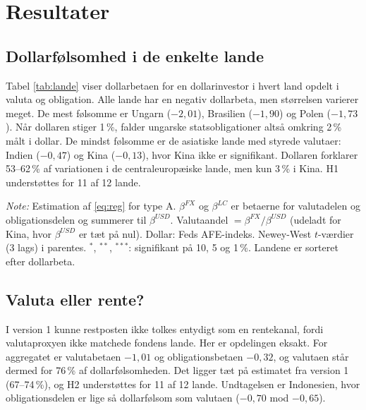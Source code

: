 \documentclass[11pt,a4paper]{article}
\begin{document}
\section{Resultater}

\subsection{Dollarfølsomhed i de enkelte lande}
Tabel \ref{tab:lande} viser dollarbetaen for en dollarinvestor i hvert land opdelt i valuta og obligation. Alle lande har en negativ dollarbeta, men størrelsen varierer meget. De mest følsomme er Ungarn ($-2{,}01$), Brasilien ($-1{,}90$) og Polen ($-1{,}73$). Når dollaren stiger 1\,\%, falder ungarske statsobligationer altså omkring 2\,\% målt i dollar. De mindst følsomme er de asiatiske lande med styrede valutaer: Indien ($-0{,}47$) og Kina ($-0{,}13$), hvor Kina ikke er signifikant. Dollaren forklarer 53--62\,\% af variationen i de centraleuropæiske lande, men kun 3\,\% i Kina. H1 understøttes for 11 af 12 lande.

\begin{table}[htbp]
\centering
\begin{threeparttable}
\caption{Dollarbeta for en dollarinvestor pr.\ land, opdelt i valuta og obligation}
\label{tab:lande}
\small

\begin{tablenotes}\footnotesize
\item \emph{Note:} Estimation af \eqref{eq:reg} for type A. $\beta^{FX}$ og $\beta^{LC}$ er betaerne for valutadelen og obligationsdelen og summerer til $\beta^{USD}$. Valutaandel $=\beta^{FX}/\beta^{USD}$ (udeladt for Kina, hvor $\beta^{USD}$ er tæt på nul). Dollar: Feds AFE-indeks. Newey-West $t$-værdier (3 lags) i parentes. $^{*}$, $^{**}$, $^{***}$: signifikant på 10, 5 og 1\,\%. Landene er sorteret efter dollarbeta.
\end{tablenotes}
\end{threeparttable}
\end{table}

\subsection{Valuta eller rente?}
I version 1 kunne restposten ikke tolkes entydigt som en rentekanal, fordi valutaproxyen ikke matchede fondens lande. Her er opdelingen eksakt. For aggregatet er valutabetaen $-1{,}01$ og obligationsbetaen $-0{,}32$, og valutaen står dermed for 76\,\% af dollarfølsomheden. Det ligger tæt på estimatet fra version 1 (67--74\,\%), og H2 understøttes for 11 af 12 lande. Undtagelsen er Indonesien, hvor obligationsdelen er lige så dollarfølsom som valutaen ($-0{,}70$ mod $-0{,}65$).
\end{document}
